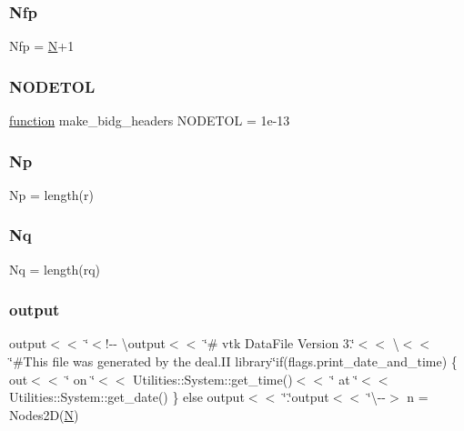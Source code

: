 \subsubsection{\texorpdfstring{Nfp}{Nfp}}
{\footnotesize\ttfamily Nfp = \hyperlink{a00473_a5b9c4563028063ee53b517cce9aa701b}{N}+1}

\mbox{\label{a00473_a459274f44c959d3b6466dbf5c40c6931}} 
\subsubsection{\texorpdfstring{N\+O\+D\+E\+T\+OL}{NODETOL}}
{\footnotesize\ttfamily \hyperlink{a00611_a2420833d971716e9bab41cc9fb3abba1}{function} make\+\_\+bidg\+\_\+headers N\+O\+D\+E\+T\+OL = 1e-\/13}

\mbox{\label{a00473_abe50207e56666a60c81e2a58f522eea3}} 
\subsubsection{\texorpdfstring{Np}{Np}}
{\footnotesize\ttfamily Np = length(r)}

\mbox{\label{a00473_a5613c6c6f438049d9d5464468692715a}} 
\subsubsection{\texorpdfstring{Nq}{Nq}}
{\footnotesize\ttfamily Nq = length(rq)}

\mbox{\label{a00473_a5913da243070c054a1a9a79e0bdc2bf5}} 
\subsubsection{\texorpdfstring{output}{output}}
{\footnotesize\ttfamily output$<$$<$ \char`\"{}$<$!-\/-\/ \textbackslash{}output$<$$<$ \char`\"{}\# vtk Data\+File Version 3.\char`\"{}$<$$<$ \textquotesingle{}\textbackslash{}\textquotesingle{}$<$$<$ \char`\"{}\#This file was generated by the deal.\+II library\char`\"{}if(flags.\+print\+\_\+date\+\_\+and\+\_\+time) \{ out$<$$<$ \char`\"{} on \char`\"{}$<$$<$ Utilities\+::\+System\+::get\+\_\+time()$<$$<$ \char`\"{} at \char`\"{}$<$$<$ Utilities\+::\+System\+::get\+\_\+date() \} else output$<$$<$ \char`\"{}.\char`\"{}output$<$$<$ \char`\"{}\textbackslash{}-\/-\/$>$ n = Nodes2D(\hyperlink{a00473_a5b9c4563028063ee53b517cce9aa701b}{N})}

